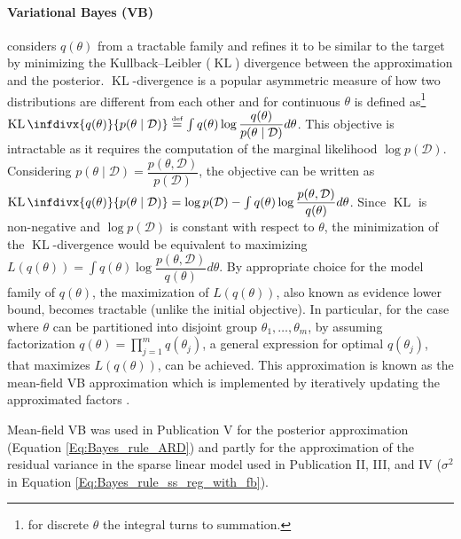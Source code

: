 \documentclass[dissertation,math,vertlayout,pdfa,colorlinks]{aaltoseries}
\newcommand{\bD}{\mathcal{D}}
\DeclareMathOperator{\KLt}{KL}
\newcommand{\KL}{\KLt\infdivx}
\begin{document}
\paragraph{Variational Bayes (VB)} \cite{Blei_VB} considers $q(\theta)$ from a tractable family and refines it to be similar to the target by minimizing the Kullback–Leibler ($\KLt$) divergence between the approximation and the posterior. $\KLt$-divergence is a popular asymmetric measure of how two distributions are different from each other and for continuous $\theta$ is defined as\footnote{for discrete $\theta$ the integral turns to summation.} $\KL{q(\theta)}{p(\theta \mid \bD)} \overset{\underset{\mathrm{def}}{}}{=} \int q(\theta) \log\dfrac{q(\theta)}{p(\theta \mid \bD)} d\theta$. This objective is intractable as it requires the computation of the marginal likelihood $\log p(\bD)$. Considering $p(\theta \mid \bD)= \dfrac{p(\theta, \bD)}{p(\bD)}$, the objective can be written as $\KL{q(\theta)}{p(\theta \mid \bD)} = \log p(\bD) - \int q(\theta) \log\dfrac{p(\theta, \bD)}{q(\theta)} d\theta $. Since $\KLt$ is non-negative and $\log p(\bD)$ is constant with respect to $\theta$, the minimization of the $\KLt$-divergence would be equivalent to maximizing $L(q(\theta)) = \int q(\theta) \log\dfrac{p(\theta, \bD)}{q(\theta)} d\theta$. By appropriate choice for the model family of $q(\theta)$, the maximization of $L(q(\theta))$, also known as evidence lower bound, becomes tractable (unlike the initial objective). In particular, for the case where $\theta$ can be partitioned into disjoint group $\theta_1,\ldots,\theta_m$, by assuming factorization $q(\theta) = \prod_{j=1}^{m}q(\theta_j)$, a general expression for optimal $q(\theta_j)$, that maximizes $L(q(\theta))$, can be achieved. This approximation is known as the mean-field VB approximation which is implemented by iteratively updating the approximated factors \cite[Chapter~10]{bishop2006pattern}.  
	
Mean-field VB was used in Publication V for the posterior approximation (Equation \ref{Eq:Bayes_rule_ARD}) and partly for the approximation of the residual variance in the sparse linear model used in Publication II, III, and IV ($\sigma^2$ in Equation \ref{Eq:Bayes_rule_ss_reg_with_fb}).
	
\end{document}
